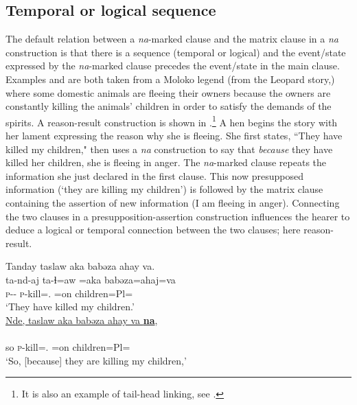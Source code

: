\subsection{Temporal or logical sequence}\label{sec:11.1.1}
\hypertarget{RefHeading1213181525720847}{}
The default relation between a \textit{na}-marked clause and the matrix clause in a \textit{na} construction is that there is a sequence (temporal or logical) and the event/state expressed by the \textit{na}{}-marked clause precedes the event/state in the main clause. Examples  and  are both taken from a Moloko legend (from the Leopard story,\citealt{Friesen2003}) where some domestic animals are fleeing their owners because the owners are constantly killing the animals’ children in order to satisfy the demands of the spirits. A reason-result construction is shown in .\footnote {It is also an example of tail-head linking, see .}  A hen begins the story with her lament expressing the reason why she is fleeing. She first states, “They have killed my children," then uses a \textit{na} construction to say that \textit{because} they have killed her children, she is fleeing in anger. The \textit{na}{}-marked clause repeats the information she just declared in the first clause. This now presupposed information (‘they are killing my children’) is followed by the matrix clause containing the assertion of new information (I am fleeing in anger). Connecting the two clauses in a presupposition-assertion construction influences the hearer to deduce a logical or temporal connection between the two clauses; here reason-result. 


\ea \label{ex:11:15}
Tanday taslaw aka babəza ahay va.\\   
\gll  ta-nd-aj    ta-ɬ=aw  =aka  babəza=ahaj=va \\
      \textsc{p}-{\PROG}-{\CL}  \textsc{p}-kill={\oneS}.{\IO}  =on  children=Pl{=\PRF} \\    
\glt ‘They have killed my children.’\\

      \medskip
\underline{Nde, taslaw  aka  babəza  ahay  va \textbf{na}},\\      
\gll {}     \\
     so   \textsc{p}-kill={\oneS}.{\IO}  =on  children=Pl={\PRF} {\PSP} \\
\glt ‘So, [because] they are killing my children,’\\
      
